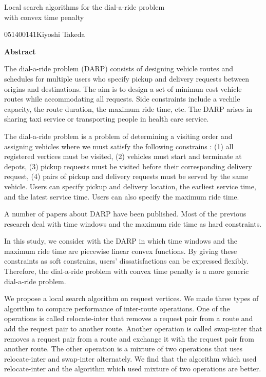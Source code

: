 

\newpage
\begin{center}{\LARGE Local  search algorithms for the dial-a-ride problem\\ with convex time penalty}\\[0.5cm]
\end{center}
\hfill {\large 051400141\qquad Kiyoshi Takeda}\\[0.5cm]
\begin{center}
{\large \bf Abstract}\\
\end{center}
The dial-a-ride problem (DARP) consists of designing vehicle routes and schedules for multiple users who specify pickup and delivery requests between origins and destinations. The aim is to design a set of minimun cost vehicle routes while accommodating all requests. Side constraints include a vechile capacity, the route duration, the maximum ride time, etc. The DARP arises in sharing taxi service or transporting people in health care service.

The dial-a-ride problem is a problem of determining a visiting order and assigning vehicles where we must satisfy the following constrains : (1) all registered vertices must be visited, (2) vehicles must start and terminate at depots, (3) pickup requests must be visited before their corresponding delivery request, (4) pairs of pickup and delivery requests must be served by the same vehicle.  Users can specify pickup and delivery location, the earliest service time, and the latest service time. Users can also specify the maximum ride time.

A number of papers about DARP have been published. Most of the previous research deal with time windows and the maximum ride time as hard constraints.

In this study, we consider with the DARP in which time windows and the maximum ride time are piecewise linear convex functions. By giving these constraints as soft constrains, users' dissatisfactions can be expressed flexibly. Therefore, the dial-a-ride problem with convex time penalty is a more generic dial-a-ride problem.

We propose a local search algorithm on request vertices. We made three types of algorithm to compare performance of inter-route operations.
One of the operations is called relocate-inter that removes a request pair from a route and add the request pair to another route. Another operation is called swap-inter that removes a request pair from a route and exchange it with the request pair from another route. The other operation is a mixture of two operations that uses relocate-inter and swap-inter alternately.
We find that the algorithm which used relocate-inter and the algorithm which used mixture of two operations are better.

